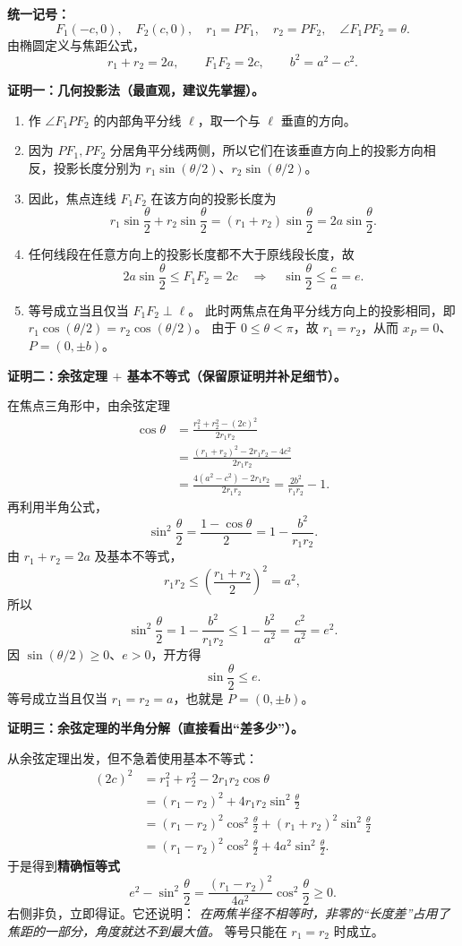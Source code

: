 \begin{proofbox}
\textbf{统一记号：}
\[
F_1(-c,0),\quad F_2(c,0),\quad
r_1=PF_1,\quad r_2=PF_2,\quad
\angle F_1PF_2=\theta.
\]
由椭圆定义与焦距公式，
\[
r_1+r_2=2a,\qquad F_1F_2=2c,\qquad b^2=a^2-c^2.
\]

\medskip
\textbf{证明一：几何投影法（最直观，建议先掌握）。}

\begin{enumerate}
    \item 作 $\angle F_1PF_2$ 的内部角平分线 $\ell$，取一个与 $\ell$ 垂直的方向。
    \item 因为 $PF_1,PF_2$ 分居角平分线两侧，所以它们在该垂直方向上的投影方向相反，投影长度分别为
    $r_1\sin(\theta/2)$、$r_2\sin(\theta/2)$。
    \item 因此，焦点连线 $F_1F_2$ 在该方向的投影长度为
    \[
    r_1\sin\frac\theta2+r_2\sin\frac\theta2
    =(r_1+r_2)\sin\frac\theta2
    =2a\sin\frac\theta2.
    \]
    \item 任何线段在任意方向上的投影长度都不大于原线段长度，故
    \[
    2a\sin\frac\theta2\le F_1F_2=2c
    \quad\Longrightarrow\quad
    \boxed{\sin\frac\theta2\le\frac ca=e.}
    \]
    \item 等号成立当且仅当 $F_1F_2\perp\ell$。
    此时两焦点在角平分线方向上的投影相同，即
    $r_1\cos(\theta/2)=r_2\cos(\theta/2)$。
    由于 $0\le\theta<\pi$，故 $r_1=r_2$，从而 $x_P=0$、$P=(0,\pm b)$。
\end{enumerate}

\medskip
\textbf{证明二：余弦定理 $+$ 基本不等式（保留原证明并补足细节）。}

在焦点三角形中，由余弦定理
\begin{align*}
\cos\theta
&=\frac{r_1^2+r_2^2-(2c)^2}{2r_1r_2}\\
&=\frac{(r_1+r_2)^2-2r_1r_2-4c^2}{2r_1r_2}\\
&=\frac{4(a^2-c^2)-2r_1r_2}{2r_1r_2}
=\frac{2b^2}{r_1r_2}-1.
\end{align*}
再利用半角公式，
\[
\sin^2\frac\theta2
=\frac{1-\cos\theta}{2}
=1-\frac{b^2}{r_1r_2}.
\]
由 $r_1+r_2=2a$ 及基本不等式，
\[
r_1r_2\le\left(\frac{r_1+r_2}{2}\right)^2=a^2,
\]
所以
\[
\sin^2\frac\theta2
=1-\frac{b^2}{r_1r_2}
\le1-\frac{b^2}{a^2}
=\frac{c^2}{a^2}=e^2.
\]
因 $\sin(\theta/2)\ge0$、$e>0$，开方得
\[
\boxed{\sin\frac\theta2\le e.}
\]
等号成立当且仅当 $r_1=r_2=a$，也就是 $P=(0,\pm b)$。

\medskip
\textbf{证明三：余弦定理的半角分解（直接看出“差多少”）。}

从余弦定理出发，但不急着使用基本不等式：
\begin{align*}
(2c)^2
&=r_1^2+r_2^2-2r_1r_2\cos\theta\\
&=(r_1-r_2)^2+4r_1r_2\sin^2\frac\theta2\\
&=(r_1-r_2)^2\cos^2\frac\theta2
 +(r_1+r_2)^2\sin^2\frac\theta2\\
&=(r_1-r_2)^2\cos^2\frac\theta2
 +4a^2\sin^2\frac\theta2.
\end{align*}
于是得到\textbf{精确恒等式}
\[
\boxed{
 e^2-\sin^2\frac\theta2
 =\frac{(r_1-r_2)^2}{4a^2}\cos^2\frac\theta2\ge0.
}
\]
右侧非负，立即得证。它还说明：
\emph{在两焦半径不相等时，非零的“长度差”占用了焦距的一部分，角度就达不到最大值。}
等号只能在 $r_1=r_2$ 时成立。


\end{proofbox}
